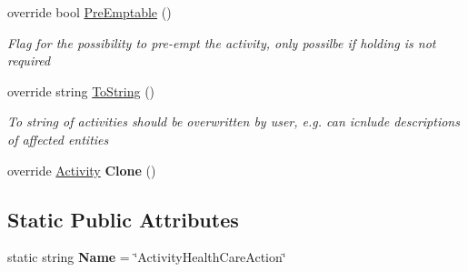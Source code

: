 \begin{DoxyCompactItemize}
override bool \hyperlink{class_general_health_care_elements_1_1_activities_1_1_activity_health_care_action_a6bb5663ca822062814fc8e507ff8dcff}{Pre\+Emptable} ()
\begin{DoxyCompactList}\small\item\em Flag for the possibility to pre-\/empt the activity, only possilbe if holding is not required \end{DoxyCompactList}\item 
override string \hyperlink{class_general_health_care_elements_1_1_activities_1_1_activity_health_care_action_a63fb5ffffcdb6ef64a88edac610a6700}{To\+String} ()
\begin{DoxyCompactList}\small\item\em To string of activities should be overwritten by user, e.\+g. can icnlude descriptions of affected entities \end{DoxyCompactList}\item 
override \hyperlink{class_simulation_core_1_1_h_c_c_m_elements_1_1_activity}{Activity} {\bfseries Clone} ()\hypertarget{class_general_health_care_elements_1_1_activities_1_1_activity_health_care_action_a76a2c03a36f0ecc1c05d1ad5b47e72f4}{}\label{class_general_health_care_elements_1_1_activities_1_1_activity_health_care_action_a76a2c03a36f0ecc1c05d1ad5b47e72f4}

\end{DoxyCompactItemize}
\subsection*{Static Public Attributes}
\begin{DoxyCompactItemize}
\item 
static string {\bfseries Name} = \char`\"{}Activity\+Health\+Care\+Action\char`\"{}\hypertarget{class_general_health_care_elements_1_1_activities_1_1_activity_health_care_action_a49a807763958535c00d8b58de21e42cf}{}\label{class_general_health_care_elements_1_1_activities_1_1_activity_health_care_action_a49a807763958535c00d8b58de21e42cf}

\end{DoxyCompactItemize}
